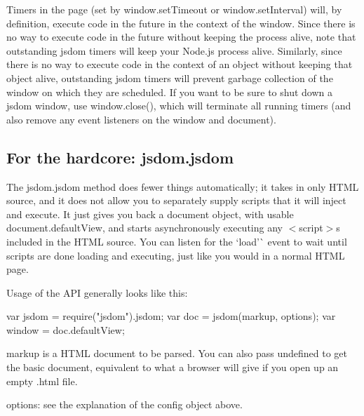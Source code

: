Timers in the page (set by {\ttfamily window.\+set\+Timeout} or {\ttfamily window.\+set\+Interval}) will, by definition, execute code in the future in the context of the {\ttfamily window}. Since there is no way to execute code in the future without keeping the process alive, note that outstanding jsdom timers will keep your Node.\+js process alive. Similarly, since there is no way to execute code in the context of an object without keeping that object alive, outstanding jsdom timers will prevent garbage collection of the {\ttfamily window} on which they are scheduled. If you want to be sure to shut down a jsdom window, use {\ttfamily window.\+close()}, which will terminate all running timers (and also remove any event listeners on the {\ttfamily window} and {\ttfamily document}).

\subsection*{For the hardcore\+: {\ttfamily jsdom.\+jsdom}}

The {\ttfamily jsdom.\+jsdom} method does fewer things automatically; it takes in only H\+T\+ML source, and it does not allow you to separately supply scripts that it will inject and execute. It just gives you back a {\ttfamily document} object, with usable {\ttfamily document.\+default\+View}, and starts asynchronously executing any {\ttfamily $<$script$>$}s included in the H\+T\+ML source. You can listen for the `\textquotesingle{}load'\`{} event to wait until scripts are done loading and executing, just like you would in a normal H\+T\+ML page.

Usage of the A\+PI generally looks like this\+:


\begin{DoxyCode}
var jsdom = require("jsdom").jsdom;
var doc = jsdom(markup, options);
var window = doc.defaultView;
\end{DoxyCode}



\begin{DoxyItemize}
\item {\ttfamily markup} is a H\+T\+ML document to be parsed. You can also pass {\ttfamily undefined} to get the basic document, equivalent to what a browser will give if you open up an empty {\ttfamily .html} file.
\item {\ttfamily options}\+: see the explanation of the {\ttfamily config} object above.
\end{DoxyItemize}

